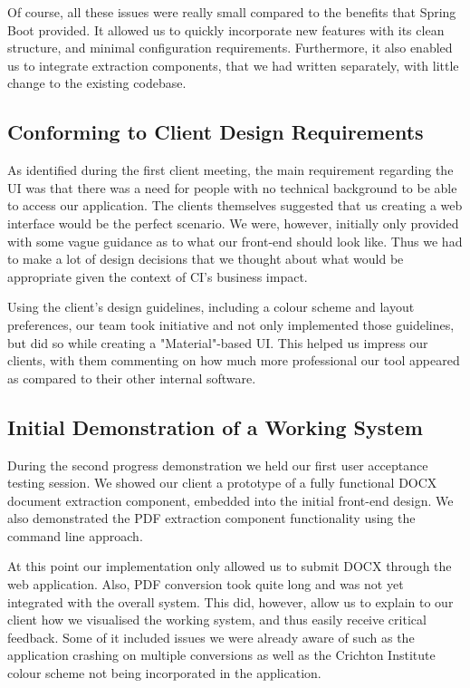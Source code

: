 \documentclass{l3proj}
\begin{document}
Of course, all these issues were really small compared to the benefits that Spring Boot provided. It allowed us to quickly incorporate new features with its clean structure, and minimal configuration requirements. Furthermore, it also enabled us to integrate extraction components, that we had written separately, with little change to the existing codebase. 

\subsection{Conforming to Client Design Requirements}
\label{sec:design_req}

As identified during the first client meeting, the main requirement regarding the UI was that there was a need for people with no technical background to be able to access our application. The clients themselves suggested that us creating a web interface would be the perfect scenario. We were, however, initially only provided with some vague guidance as to what our front-end should look like. Thus we had to make a lot of design decisions that we thought about what would be appropriate given the context of CI's business impact.

Using the client's design guidelines, including a colour scheme and layout preferences, our team took initiative and not only implemented those guidelines, but did so while creating a "Material"-based UI. This helped us impress our clients, with them commenting on how much more professional our tool appeared as compared to their other internal software. 

\subsection{Initial Demonstration of a Working System}
\label{sec:first_demo}
During the second progress demonstration we held our first user acceptance testing session. We showed our client a prototype of a fully functional DOCX document extraction component, embedded into the initial front-end design. We also demonstrated the PDF extraction component functionality using the command line approach.

At this point our implementation only allowed us to submit DOCX through the web application. Also, PDF conversion took quite long and was not yet integrated with the overall system. This did, however, allow us to explain to our client how we visualised the working system, and thus easily receive critical feedback. Some of it included issues we were already aware of such as the application crashing on multiple conversions as well as the Crichton Institute colour scheme not being incorporated in the application.
\end{document}
